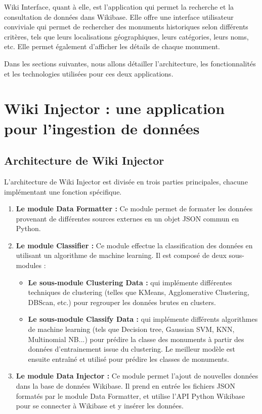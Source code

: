 \documentclass[a4paper, 12pt]{article}
\begin{document}
Wiki Interface, quant à elle, est l'application qui permet la recherche et la consultation de données dans Wikibase. Elle offre une interface utilisateur conviviale qui permet de rechercher des monuments historiques selon différents critères, tels que leurs localisations géographiques, leurs catégories, leurs noms, etc. Elle permet également d'afficher les détails de chaque monument.

Dans les sections suivantes, nous allons détailler l'architecture, les fonctionnalités et les technologies utilisées pour ces deux applications.
    
\section{Wiki Injector : une application pour l'ingestion de données}
    \subsection{Architecture de Wiki Injector}

L'architecture de Wiki Injector est divisée en trois parties principales, chacune implémentant une fonction spécifique. 

\begin{enumerate}
    \item \textbf{Le module Data Formatter :} Ce module permet de formater les données provenant de différentes sources externes en un objet JSON commun en Python. \\

    \item \textbf{Le module Classifier :} Ce module effectue la classification des données en utilisant un algorithme de machine learning. Il est composé de deux sous-modules : \\
    \begin{itemize}
        \item \textbf{\textbf{Le sous-module Clustering Data :}} qui implémente différentes techniques de clustering (telles que KMeans, Agglomerative Clustering, DBScan, etc.) pour regrouper les données brutes en clusters.\\
        
        \item \textbf{Le sous-module Classify Data :} qui implémente différents algorithmes de machine learning (tels que Decision tree, Gaussian SVM, KNN, Multinomial NB...) pour prédire la classe des monuments à partir des données d'entrainement issue du clustering. Le meilleur modèle est ensuite entraîné et utilisé pour prédire les classes de monuments.\\
    \end{itemize}

    \item \textbf{Le module Data Injector :} Ce module permet l'ajout de nouvelles données dans la base de données Wikibase. Il prend en entrée les fichiers JSON formatés par le module Data Formatter, et utilise l'API Python Wikibase pour se connecter à Wikibase et y insérer les données.
\end{enumerate}
\end{document}
